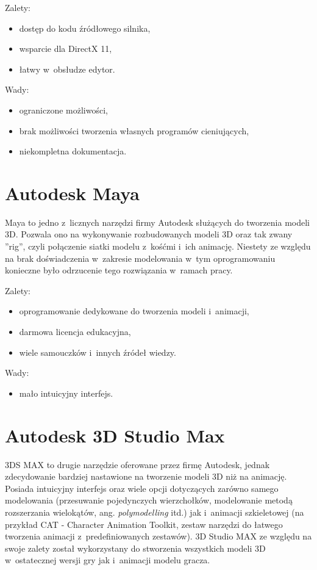 {\raggedright Zalety:
\begin{itemize}
\item dostęp do kodu źródłowego silnika,
\item wsparcie dla DirectX 11,
\item łatwy w~obsłudze edytor.
\end{itemize}

Wady:
\begin{itemize}
\item ograniczone możliwości,
\item brak możliwości tworzenia własnych programów cieniujących,
\item niekompletna dokumentacja.
\end{itemize}
}

\section{Autodesk Maya}

Maya to jedno z~licznych narzędzi firmy Autodesk służących do tworzenia modeli 3D. Pozwala ono na wykonywanie rozbudowanych modeli 3D oraz tak zwany ''rig'', czyli połączenie siatki modelu z~kośćmi i~ich animację. Niestety ze względu na brak doświadczenia w~zakresie modelowania w~tym oprogramowaniu konieczne było odrzucenie tego rozwiązania w~ramach pracy.

{\raggedright Zalety:
\begin{itemize}
\item oprogramowanie dedykowane do tworzenia modeli i~animacji,
\item darmowa licencja edukacyjna,
\item wiele samouczków i~innych źródeł wiedzy.
\end{itemize}

Wady:
\begin{itemize}
\item mało intuicyjny interfejs.
\end{itemize}
}

\section{Autodesk 3D Studio Max}

3DS MAX to drugie narzędzie oferowane przez firmę Autodesk, jednak zdecydowanie bardziej nastawione na tworzenie modeli 3D niż na animację. Posiada intuicyjny interfejs oraz wiele opcji dotyczących zarówno samego modelowania (przesuwanie pojedynczych wierzchołków, modelowanie metodą rozszerzania wielokątów, ang. \emph{polymodelling} itd.) jak i~animacji szkieletowej (na przykład CAT - Character Animation Toolkit, zestaw narzędzi do łatwego tworzenia animacji z~predefiniowanych zestawów). 3D Studio MAX ze względu na swoje zalety został wykorzystany do stworzenia wszystkich modeli 3D w~ostatecznej wersji gry jak i~animacji modelu gracza.


